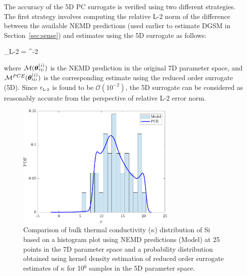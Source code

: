 The accuracy of the 5D PC surrogate is verified using two different strategies. The first strategy involves
computing the relative L-2 norm of the difference between the available NEMD predictions (used earlier
to estimate DGSM in Section~\ref{sec:sense}) and estimates using the 5D surrogate as follows:

\be
\epsilon_{\mbox{\tiny{L-2}}} = 
 ^{-2}
\ee
 
\noindent where $\mathcal{M}(\bm{\theta}_{\mbox{\tiny{7D}}}^{(i)})$ is the NEMD prediction in the original 7D
parameter space, and $\mathcal{M}^{PCE}(\bm{\theta}_{\mbox{\tiny{5D}}}^{(i)})$ is the corresponding 
estimate using the reduced order surrogate (5D). 
Since $\epsilon_{\mbox{\tiny{L-2}}}$ is found to be $\mathcal{O}(10^{-2})$, the 5D surrogate can be considered as
reasonably accurate from the perspective of relative L-2 error norm. 

\begin{figure}[htbp]
 \begin{center}
  \includegraphics[width=0.70\textwidth]{./Figures/PCE5D_kde}
\caption{Comparison of bulk thermal conductivity ($\kappa$) distribution of Si based on a histogram plot
using NEMD predictions (Model) at 25 points in the 7D parameter space and a probability distribution obtained 
using kernel density estimation of  reduced order surrogate estimates of $\kappa$ for 10$^6$ samples in the 5D
parameter space.}
\label{fig:verify}
\end{center}
\end{figure}

